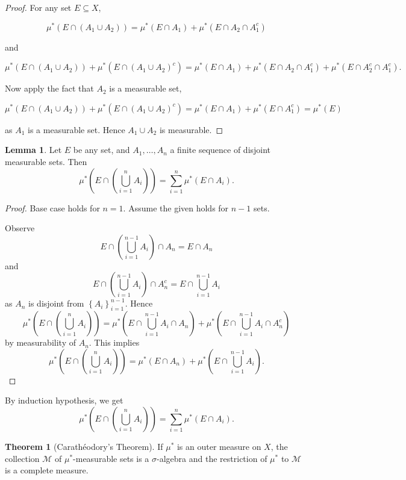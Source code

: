 \documentclass[11pt]{article}
\theoremstyle{definition}
\newtheorem{theorem}{Theorem}[section]
\newtheorem{lemma}{Lemma}[section]
\theoremstyle{remark}
\begin{document}
\begin{proof}
For any set $E \subseteq X$,

\[
\mu^*(E \cap (A_1 \cup A_2)) = \mu^*(E \cap A_1) + \mu^*(E \cap A_2 \cap A_1^c)
\]

and

\[
\mu^*(E \cap (A_1 \cup A_2)) + \mu^*(E \cap (A_1 \cup A_2)^c) = \mu^*(E \cap A_1) + \mu^*(E \cap A_2 \cap A_1^c) + \mu^*(E \cap A_2^c \cap A_1^c).
\]

Now apply the fact that $A_2$ is a measurable set,

\[
\mu^*(E \cap (A_1 \cup A_2)) + \mu^*(E \cap (A_1 \cup A_2)^c) = \mu^*(E \cap A_1) + \mu^*(E \cap A_1^c) = \mu^*(E)
\]

as $A_1$ is a measurable set. Hence $A_1 \cup A_2$ is measurable.
\end{proof}

\begin{lemma}
Let $E$ be any set, and $A_1, \dots, A_n$ a finite sequence of disjoint measurable sets. Then
\[
\mu^*\left(E \cap \left(\bigcup_{i=1}^n A_i\right)\right) = \sum_{i=1}^n \mu^*(E \cap A_i).
\]

\begin{proof}
Base case holds for $n=1$. Assume the given holds for $n-1$ sets.

Observe
\[
E \cap \left(\bigcup_{i=1}^{n-1} A_i\right) \cap A_n = E \cap A_n
\]
and
\[
E \cap \left(\bigcup_{i=1}^{n-1} A_i\right) \cap A_n^c = E \cap \bigcup_{i=1}^{n-1} A_i
\]
as $A_n$ is disjoint from $\left\{A_i\right\}_{i=1}^{n-1}$. Hence
\[
\mu^*\left(E \cap \left(\bigcup_{i=1}^n A_i\right)\right) = \mu^*\left(E \cap \bigcup_{i=1}^{n-1} A_i \cap A_n\right) + \mu^*\left(E \cap \bigcup_{i=1}^{n-1} A_i \cap A_n^c\right)
\]
by measurability of $A_n$. This implies
\[
\mu^*\left(E \cap \left(\bigcup_{i=1}^n A_i\right)\right) = \mu^*(E \cap A_n) + \mu^*\left(E \cap \bigcup_{i=1}^{n-1} A_i\right).
\]
\end{proof}
\end{lemma}

By induction hypothesis, we get
\[
\mu^{*}\left(E \cap \left(\bigcup_{i=1}^n A_i\right)\right) = \sum_{i=1}^n \mu^{*}(E \cap A_i).
\]

\begin{theorem}[Carathéodory's Theorem]
If $\mu^*$ is an outer measure on $X$, the collection $\mathcal{M}$ of $\mu^*$-measurable sets is a $\sigma$-algebra and the restriction of $\mu^*$ to $\mathcal{M}$ is a complete measure.
\end{theorem}
\end{document}
